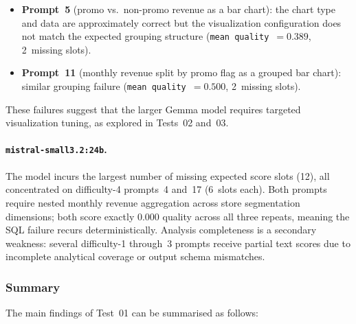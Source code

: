 \begin{itemize}
    \item \textbf{Prompt~5} (promo vs.\ non-promo revenue as a bar chart):
          the chart type and data are approximately correct but the
          visualization configuration does not match the expected grouping
          structure (\texttt{mean quality}~$= 0.389$, 2~missing slots).
    \item \textbf{Prompt~11} (monthly revenue split by promo flag as a
          grouped bar chart): similar grouping failure
          (\texttt{mean quality}~$= 0.500$, 2~missing slots).
\end{itemize}

These failures suggest that the larger Gemma model requires targeted
visualization tuning, as explored in Tests~02 and~03.

\paragraph{\texttt{mistral-\allowbreak small3.2:24b}.}
The model incurs the largest number of missing expected score slots (12),
all concentrated on difficulty-4 prompts~4 and~17 (6~slots each). Both
prompts require nested monthly revenue aggregation across store segmentation
dimensions; both score exactly 0.000 quality across all three repeats,
meaning the SQL failure recurs deterministically. Analysis completeness is
a secondary weakness: several difficulty-1 through~3 prompts receive partial
text scores due to incomplete analytical coverage or output schema mismatches.

\subsubsection{Summary}

The main findings of Test~01 can be summarised as follows:

